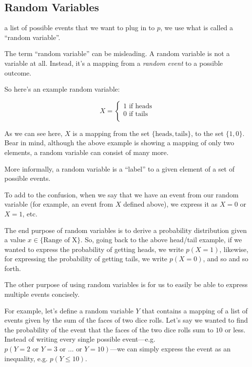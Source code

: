 \documentclass{tufte-handout}
\begin{document}
\subsection{Random Variables}

 a list of possible events that we want to plug in to $p$, we use what is called a ``random variable''.

The term ``random variable'' can be misleading. A random variable is not a variable at all. Instead, it's a mapping from a \emph{random event} to a possible outcome.

So here's an example random variable:

\begin{equation}
  X =
    \begin{cases}
      1 \text{ if } \text{heads} \\
      0 \text{ if } \text{tails} \\
    \end{cases}
\end{equation}

As we can see here, $X$ is a mapping from the set $\{ \text{heads},
\text{tails} \}$, to the set $\{ 1, 0 \}$. Bear in mind, although the above example is showing a mapping of only two elements, a random variable can consist of many more.

More informally, a random variable is a ``label'' to a given element of a set of possible events.

To add to the confusion, when we say that we have an event from our random variable (for example, an event from $X$ defined above), we express it as $X = 0$ or $X = 1$, etc.

The end purpose of random variables is to derive a probability distribution given a value $x \in \{ \text{Range of X} \}$. So, going back to the above head/tail example, if we wanted to express the probability of getting heads, we write $p(X = 1)$, likewise, for expressing the probability of getting tails, we write $p(X = 0)$, and so and so forth.

The other purpose of using random variables is for us to easily be able to express multiple events concisely.

For example, let's define a random variable $Y$ that contains a mapping of a list of events given by the sum of the faces of two dice rolls. Let's say we wanted to find the probability of the event that the faces of the two dice rolls sum to $10$ or less. Instead of writing every single possible event---e.g. $p(Y = 2 \text{ or } Y = 3 \text{ or } \ldots \text{ or } Y = 10)$---we can simply express the event as an inequality, e.g. $p(Y \leq 10)$.
\end{document}
